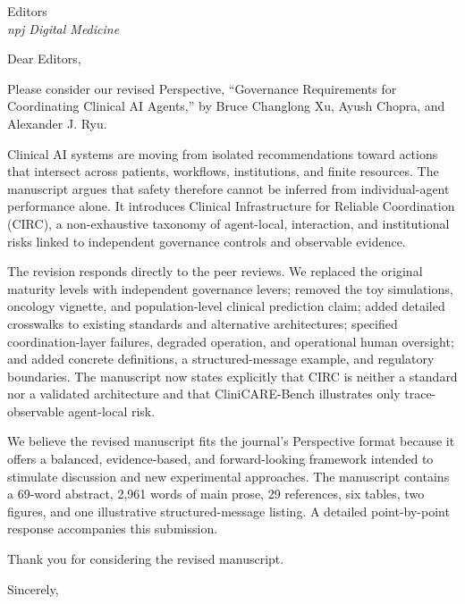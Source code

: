 \documentclass[11pt]{letter}
\date{August 30, 2026}
\begin{document}
\begin{letter}{Editors\\\textit{npj Digital Medicine}}

\opening{Dear Editors,}

Please consider our revised Perspective, ``Governance Requirements for Coordinating Clinical AI
Agents,'' by Bruce Changlong Xu, Ayush Chopra, and Alexander J. Ryu.

Clinical AI systems are moving from isolated recommendations toward actions that intersect across
patients, workflows, institutions, and finite resources. The manuscript argues that safety therefore
cannot be inferred from individual-agent performance alone. It introduces Clinical Infrastructure for
Reliable Coordination (CIRC), a non-exhaustive taxonomy of agent-local, interaction, and institutional
risks linked to independent governance controls and observable evidence.

The revision responds directly to the peer reviews. We replaced the original maturity levels with
independent governance levers; removed the toy simulations, oncology vignette, and population-level
clinical prediction claim; added detailed crosswalks to existing standards and alternative
architectures; specified coordination-layer failures, degraded operation, and operational human
oversight; and added concrete definitions, a structured-message example, and regulatory boundaries.
The manuscript now states explicitly that CIRC is neither a standard nor a validated architecture and
that CliniCARE-Bench illustrates only trace-observable agent-local risk.

We believe the revised manuscript fits the journal's Perspective format because it offers a balanced,
evidence-based, and forward-looking framework intended to stimulate discussion and new experimental
approaches. The manuscript contains a 69-word abstract, 2,961 words of main prose, 29 references, six
tables, two figures, and one illustrative structured-message listing. A detailed point-by-point
response accompanies this submission.

Thank you for considering the revised manuscript.

\closing{Sincerely,}

\end{letter}
\end{document}
